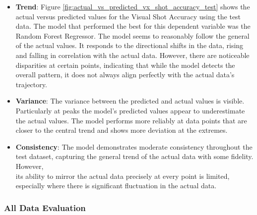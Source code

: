 \begin{itemize}
    \item \textbf{Trend}: Figure \ref{fig:actual_vs_predicted_vx_shot_accuracy_test} shows the actual versus predicted values for the Visual Shot Accuracy using the test data. The model that performed
          the best for this dependent variable was the Random Forest Regressor. The model seems to reasonably follow the general of the actual values. It responds to the directional shifts in the data,
          rising and falling in correlation with the actual data. However, there are noticeable disparities at certain points, indicating that while the model detects the overall pattern, it does not always align
          perfectly with the actual data's trajectory.
    \item \textbf{Variance}: The variance between the predicted and actual values is visible. Particularly at peaks the model's predicted values appear to underestimate the actual values. The model performs
          more reliably at data points that are closer to the central trend and shows more deviation at the extremes.
    \item \textbf{Consistency}: The model demonstrates moderate consistency throughout the test dataset, capturing the general trend of the actual data with some fidelity. However, \\
          its ability to mirror the actual data precisely at every point is limited, especially where there is significant fluctuation in the actual data.

\end{itemize}

\subsubsection*{All Data Evaluation}

